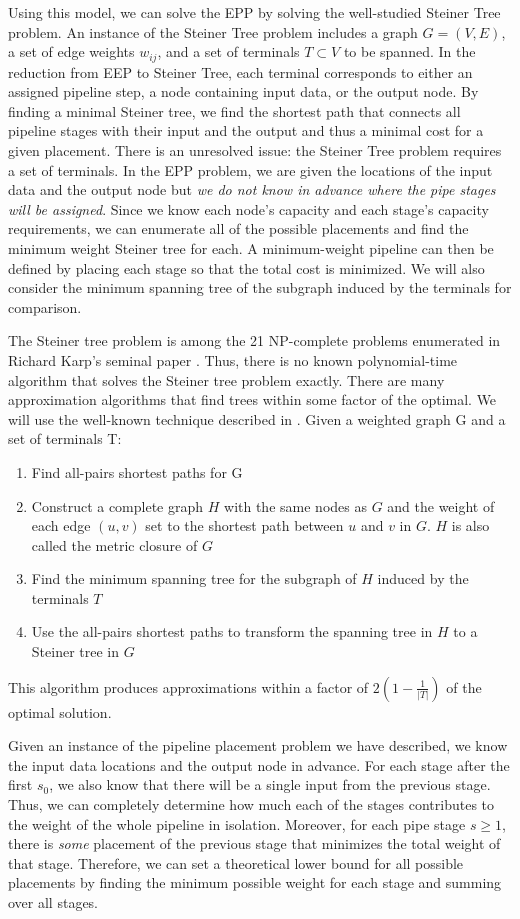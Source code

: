 \documentclass{acmart}
\begin{document}
	Using this model, we can solve the EPP by solving the well-studied Steiner Tree problem. An instance of the Steiner Tree problem includes a graph $G = (V,E)$, a set of edge weights $w_{ij}$, and a set of terminals $T \subset V$ to be spanned. In the reduction from EEP to Steiner Tree, each terminal corresponds to either an assigned pipeline step, a node containing input data, or the output node. By finding a minimal Steiner tree, we find the shortest path that connects all pipeline stages with their input and the output and thus a minimal cost for a given placement. There is an unresolved issue: the Steiner Tree problem requires a set of terminals. In the EPP problem, we are given the locations of the input data and the output node but \textit{we do not know in advance where the pipe stages will be assigned}. Since we know each node's capacity and each stage's capacity requirements, we can enumerate all of the possible placements and find the minimum weight Steiner tree for each. A minimum-weight pipeline can then be defined by placing each stage so that the total cost is minimized. We will also consider the minimum spanning tree of the subgraph induced by the terminals for comparison.
	
	The Steiner tree problem is among the 21 NP-complete problems enumerated in Richard Karp's seminal paper \cite{Karp1972ReducibilityAC}. Thus, there is no known polynomial-time algorithm that solves the Steiner tree problem exactly. There are many approximation algorithms that find trees within some factor of the optimal. We will use the well-known technique described in \cite{Kou1981}. Given a weighted graph G and a set of terminals T:
	\begin{enumerate}
	    \item Find all-pairs shortest paths for G
	    \item Construct a complete graph $H$ with the same nodes as $G$ and the weight of each edge $(u,v)$ set to the shortest path between $u$ and $v$ in $G$. $H$ is also called the metric closure of $G$
	    \item Find the minimum spanning tree for the subgraph of $H$ induced by the terminals $T$
	    \item Use the all-pairs shortest paths to transform the spanning tree in $H$ to a Steiner tree in $G$
	\end{enumerate}
	This algorithm produces approximations within a factor of $2(1 - \frac{1}{|T|})$ of the optimal solution.
	
	Given an instance of the pipeline placement problem we have described, we know the input data locations and the output node in advance. For each stage after the first $s_{0}$, we also know that there will be a single input from the previous stage. Thus, we can completely determine how much each of the stages contributes to the weight of the whole pipeline in isolation. Moreover, for each pipe stage $s \ge 1$, there is \textit{some} placement of the previous stage that minimizes the total weight of that stage. Therefore, we can set a theoretical lower bound for all possible placements by finding the minimum possible weight for each stage and summing over all stages.
	
\end{document}

